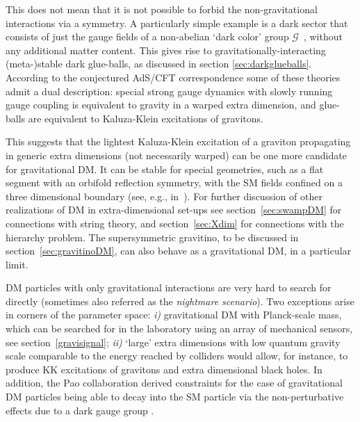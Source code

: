 \smallskip

This does not mean that it is not possible to forbid the non-gravitational interactions via a symmetry. 
A particularly simple example is a dark sector that consists of just the gauge fields of
 a non-abelian `dark color' group $\mathcal{G}$~\cite{GravDM}, without any additional matter content. 
This gives rise to gravitationally-interacting (meta-)stable dark glue-balls, as discussed in section \ref{sec:darkglueballs}.
According to the conjectured AdS/CFT correspondence some of these theories admit a dual description:
special strong gauge dynamics with slowly running gauge coupling is equivalent to gravity in a warped extra dimension,
and glue-balls are equivalent to Kaluza-Klein excitations of gravitons.

This suggests that the lightest Kaluza-Klein excitation of a graviton propagating in generic extra dimensions (not necessarily warped)
can be one more candidate for gravitational DM.
It can be stable for special geometries, such as a flat segment with an orbifold reflection symmetry, with
the SM fields confined on a three dimensional boundary (see, e.g.,  in~\cite{GravDM}). 
For further discussion of other realizations of DM in extra-dimensional set-ups 
see section~\ref{sec:swampDM} for connections with string theory, and section~\ref{sec:Xdim}  for connections with the hierarchy problem. 
The supersymmetric gravitino, to be discussed in section~\ref{sec:gravitinoDM}, can also behave as a gravitational DM, in a particular limit.

\medskip

DM particles with only gravitational interactions are very hard to search for directly (sometimes also referred as the {\em nightmare scenario}). 
Two exceptions arise in corners of the parameter space:
{\em i)} gravitational DM with  Planck-scale mass, which can be searched for in the laboratory using an array of mechanical sensors, see section~\ref{gravisignal};
{\em ii)} `large' extra dimensions with low quantum gravity scale comparable to the energy reached by colliders would allow, for instance, to produce
KK excitations of gravitons and extra dimensional black holes.
In addition, the {\sc Pao} collaboration derived constraints for the case of gravitational DM particles being able to decay into the SM particle via the non-perturbative effects due to a dark gauge group \cite{GravDM}.




